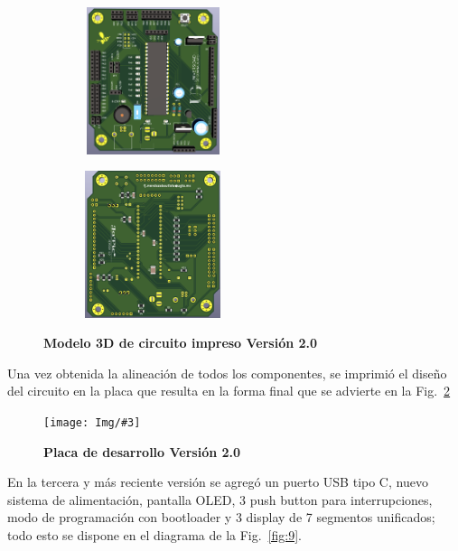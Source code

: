 \documentclass[times, 10pt,twocolumn]{article}
\newcommand{\Img}[5]{
   \begin{figure}[H]
   	   \centering
       \texttt{[image: Img/\#3]}
       \caption{ \centering \textbf{\small #4}}
       \label{#5}
       \end{figure}
   }
\begin{document}
\begin{figure}[H]
  \begin{subfigure}[b]{0.4\columnwidth}
    \includegraphics[width=4.3cm, height=4.3cm]{Img/segunda_version_3d.png}
  \end{subfigure}
  \hspace{0.7cm}
  \begin{subfigure}[b]{0.4\columnwidth}
    \includegraphics[width=4.3cm, height=4.3cm]{Img/segunda_version_pcb_b.png}
  \end{subfigure}
   \caption{\centering \textbf{Modelo 3D de circuito impreso Versión 2.0}} 
   \label{fig:7}
 \end{figure}


Una vez obtenida la alineación de todos los componentes, se imprimió el diseño del circuito en la placa que resulta en la forma final que se advierte en la Fig.~\ref{fig:8}
\Img{7.5cm}{7.0cm}{segunda_version_final}{Placa de desarrollo Versión 2.0}{fig:8}


En la tercera y más reciente versión se agregó un puerto USB tipo C, nuevo sistema de alimentación, pantalla OLED, 3 push button para interrupciones, modo de programación con bootloader y 3 display de 7 segmentos unificados; todo esto se dispone en el diagrama de la Fig.~\ref{fig:9}.\\
\end{document}
